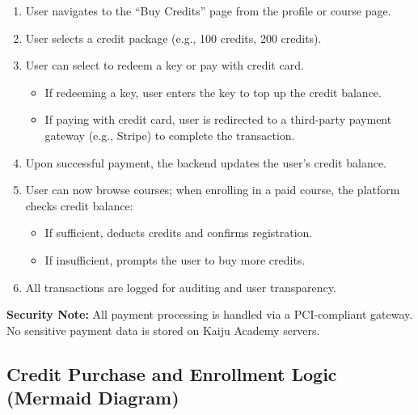 \documentclass[a4paper, 11pt]{scrreprt}
\begin{document}
\begin{enumerate}
    \item User navigates to the ``Buy Credits'' page from the profile or course page.
    \item User selects a credit package (e.g., 100 credits, 200 credits).
    \item User can select to redeem a key or pay with credit card.
        \begin{itemize}[leftmargin=1em]
            \item If redeeming a key, user enters the key to top up the credit balance.
            \item If paying with credit card, user is redirected to a third-party payment gateway (e.g., Stripe) to complete the transaction.
        \end{itemize}
    \item Upon successful payment, the backend updates the user's credit balance.
    \item User can now browse courses; when enrolling in a paid course, the platform checks credit balance:
        \begin{itemize}[leftmargin=1em]
            \item If sufficient, deducts credits and confirms registration.
            \item If insufficient, prompts the user to buy more credits.
        \end{itemize}
    \item All transactions are logged for auditing and user transparency.
\end{enumerate}

\textbf{Security Note:} All payment processing is handled via a PCI-compliant gateway. No sensitive payment data is stored on Kaiju Academy servers.

\subsection{Credit Purchase and Enrollment Logic (Mermaid Diagram)}
\end{document}
